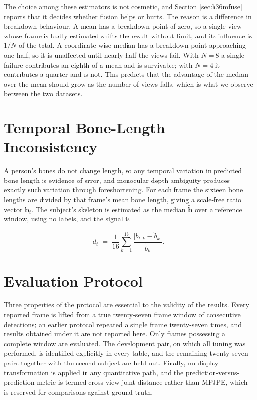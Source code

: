 \documentclass[12pt,a4paper]{report}
\begin{document}
The choice among these estimators is not cosmetic, and Section \ref{sec:h36mfuse} reports that it decides whether fusion helps or hurts. The reason is a difference in breakdown behaviour. A mean has a breakdown point of zero, so a single view whose frame is badly estimated shifts the result without limit, and its influence is $1/N$ of the total. A coordinate-wise median has a breakdown point approaching one half, so it is unaffected until nearly half the views fail. With $N=8$ a single failure contributes an eighth of a mean and is survivable; with $N=4$ it contributes a quarter and is not. This predicts that the advantage of the median over the mean should grow as the number of views falls, which is what we observe between the two datasets.

\section{Temporal Bone-Length Inconsistency}

A person's bones do not change length, so any temporal variation in predicted bone length is evidence of error, and monocular depth ambiguity produces exactly such variation through foreshortening. For each frame the sixteen bone lengths are divided by that frame's mean bone length, giving a scale-free ratio vector $\mathbf{b}_t$. The subject's skeleton is estimated as the median $\tilde{\mathbf{b}}$ over a reference window, using no labels, and the signal is

\begin{equation}
d_t \;=\; \frac{1}{16}\sum_{k=1}^{16}
          \frac{\lvert b_{t,k} - \tilde{b}_{k} \rvert}{\tilde{b}_{k}} .
\end{equation}

\section{Evaluation Protocol}
\label{sec:protocol}

Three properties of the protocol are essential to the validity of the results. Every reported frame is lifted from a true twenty-seven frame window of consecutive detections; an earlier protocol repeated a single frame twenty-seven times, and results obtained under it are not reported here. Only frames possessing a complete window are evaluated. The development pair, on which all tuning was performed, is identified explicitly in every table, and the remaining twenty-seven pairs together with the second subject are held out. Finally, no display transformation is applied in any quantitative path, and the prediction-versus-prediction metric is termed cross-view joint distance rather than MPJPE, which is reserved for comparisons against ground truth.
\end{document}
